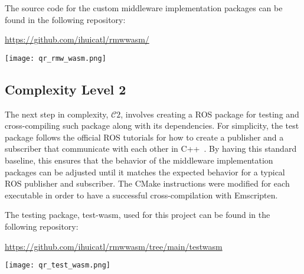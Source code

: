         \vspace{0.5em}
        \begin{tcolorbox}[title=Example 1]
            \begin{minipage}[t]{0.87\linewidth}
                \vspace*{0pt}
                The source code for the custom middleware implementation packages can be found in the following repository:

                \href{https://github.com/ihuicatl/rmw_wasm/}{\textsf{https://github.com/ihuicatl/rmw\smallunderscore  wasm/}}
            \end{minipage}\hfill%
            \begin{minipage}[t]{0.1\linewidth}
                \vspace*{0pt}
                \texttt{[image: qr\_rmw\_wasm.png]}
            \end{minipage}
        \end{tcolorbox}

        \subsection{Complexity Level 2}

        The next step in complexity, $\mathcal{C}2$, involves creating a \ac{ROS} package for testing and cross-compiling such package along with its dependencies. For simplicity, the test package follows the official \ac{ROS} tutorials for how to create a publisher and a subscriber that communicate with each other in C++~\cite{humbletutorial}. By having this standard baseline, this ensures that the behavior of the middleware implementation packages can be adjusted until it matches the expected behavior for a typical \ac{ROS} publisher and subscriber. The CMake instructions were modified for each executable in order to have a successful cross-compilation with Emscripten. 

        \vspace{0.5em}
        \begin{tcolorbox}[title=Example 2]
            \begin{minipage}[t]{0.87\linewidth}
                \vspace*{0pt}
                The testing package, \textsf{test-wasm}, used for this project can be found in the following repository:

                \href{https://github.com/ihuicatl/rmw_wasm/tree/main/test_wasm}{\textsf{https://github.com/ihuicatl/rmw\smallunderscore  wasm/tree/main/test\smallunderscore  wasm}}
            \end{minipage}\hfill%
            \begin{minipage}[t]{0.1\linewidth}
                \vspace*{0pt}
                \texttt{[image: qr\_test\_wasm.png]}
            \end{minipage}
        \end{tcolorbox}


